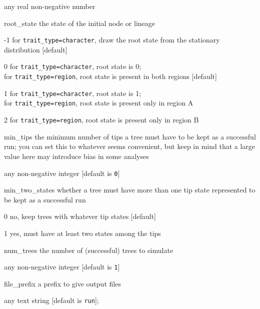 \documentclass[10pt]{article}
\begin{document}
\begin{optdescrip}
		\begin{valdescrip}
			\item[] any real non-negative number
		\end{valdescrip}
	\item[root\_state] the state of the initial node or lineage
		\begin{valdescrip}
			\item[-1] for \texttt{trait\_type=character}, draw the root state from the stationary distribution [default]
			\item[0] for \texttt{trait\_type=character}, root state is 0; \\
				for \texttt{trait\_type=region}, root state is present in both regions [default]
			\item[1] for \texttt{trait\_type=character}, root state is 1; \\
				for \texttt{trait\_type=region}, root state is present only in region A
			\item[2] for \texttt{trait\_type=region}, root state is present only in region B
		\end{valdescrip}
	\item[min\_tips] the minimum number of tips a tree must have to be kept as a successful run; you can set this to whatever seems convenient, but keep in mind that a large value here may introduce bias in some analyses
		\begin{valdescrip}
			\item[] any non-negative integer [default is \texttt{0}]
		\end{valdescrip}
	\item[min\_two\_states] whether a tree must have more than one tip state represented to be kept as a successful run
		\begin{valdescrip}
			\item[0] no, keep trees with whatever tip states [default]
			\item[1] yes, must have at least two states among the tips
		\end{valdescrip}
	\item[num\_trees] the number of (successful) trees to simulate
		\begin{valdescrip}
			\item[] any non-negative integer [default is \texttt{1}]
		\end{valdescrip}
	\item[file\_prefix] a prefix to give output files
		\begin{valdescrip}
			\item[] any text string [default is \texttt{run}];

\end{valdescrip}
\end{optdescrip}
\end{document}
